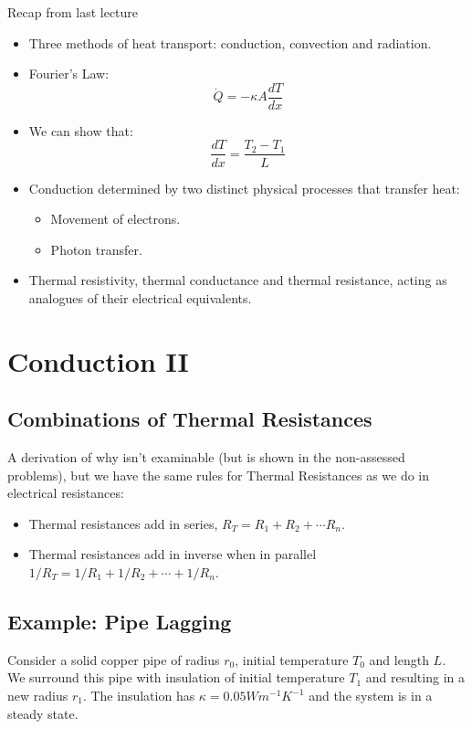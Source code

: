 
Recap from last lecture
\begin{itemize}
    \item Three methods of heat transport: conduction, convection and radiation.
    \item Fourier's Law:
    \[
        \dot{Q} = - \kappa A \frac{dT}{dx}
    \]
    \item We can show that: 
    \[
        \frac{dT}{dx} = \frac{T_2 - T_1}{L}
    \]
    \item Conduction determined by two distinct physical processes that transfer heat:
    \begin{itemize}
        \item Movement of electrons.
        \item Photon transfer.
    \end{itemize}
    \item Thermal resistivity, thermal conductance and thermal resistance, acting as analogues of their electrical equivalents.
\end{itemize}

\section{Conduction II}
\subsection{Combinations of Thermal Resistances}
A derivation of why isn't examinable (but is shown in the non-assessed problems), but we have the same rules for Thermal Resistances as we do in electrical resistances:
\begin{itemize}
    \item Thermal resistances add in series, $R_T = R_1 + R_2 + \cdots R_n$.
    \item Thermal resistances add in inverse when in parallel $1/R_T = 1/R_1 + 1/R_2 + \cdots + 1/R_n$.
\end{itemize}

\subsection{Example: Pipe Lagging}
Consider a solid copper pipe of radius $r_0$, initial temperature $T_0$ and length $L$. We surround this pipe with insulation of initial temperature $T_1$ and resulting in a new radius $r_1$. The insulation has $\kappa = 0.05 \si{W m^{-1} K^{-1}}$ and the system is in a steady state. 

